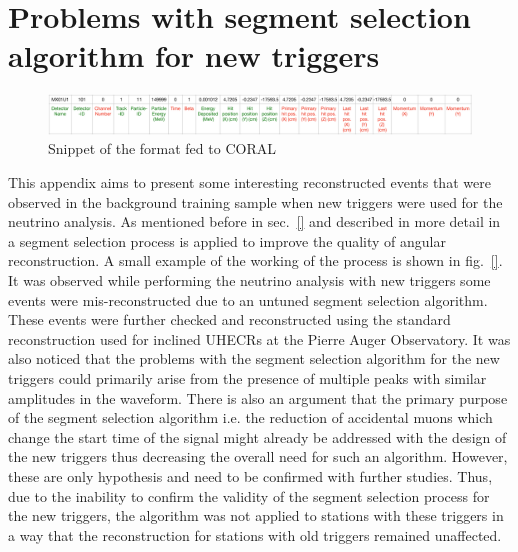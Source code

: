 \chapter{Problems with segment selection algorithm for new triggers} 
\label{sec:app_3}
\begin{figure}[h!]
\centering
\includegraphics[width=18cm]{thesis_figures/TGEANT_format.pdf}
\caption{Snippet of the format fed to CORAL}
\label{fig:Format}
\end{figure}

This appendix aims to present some interesting reconstructed events that were observed in the background training sample when new triggers were used for the neutrino analysis. As mentioned before in sec.~\ref{} and described in more detail in~\cite{} a segment selection process is applied to improve the quality of angular reconstruction. A small example of the working of the process is shown in fig.~\ref{}. It was observed while performing the neutrino analysis with new triggers some events were mis-reconstructed due to an untuned segment selection algorithm. These events were further checked and reconstructed using the standard reconstruction used for inclined UHECRs at the Pierre Auger Observatory. It was also noticed that the problems with the segment selection algorithm for the new triggers could primarily arise from the presence of multiple peaks with similar amplitudes in the waveform. There is also an argument that the primary purpose of the segment selection algorithm i.e. the reduction of accidental muons which change the start time of the signal might already be addressed with the design of the new triggers thus decreasing the overall need for such an algorithm. However, these are only hypothesis and need to be confirmed with further studies. Thus, due to the inability to confirm the validity of the segment selection process for the new triggers, the algorithm was not applied to stations with these triggers in a way that the reconstruction for stations with old triggers remained unaffected. 


